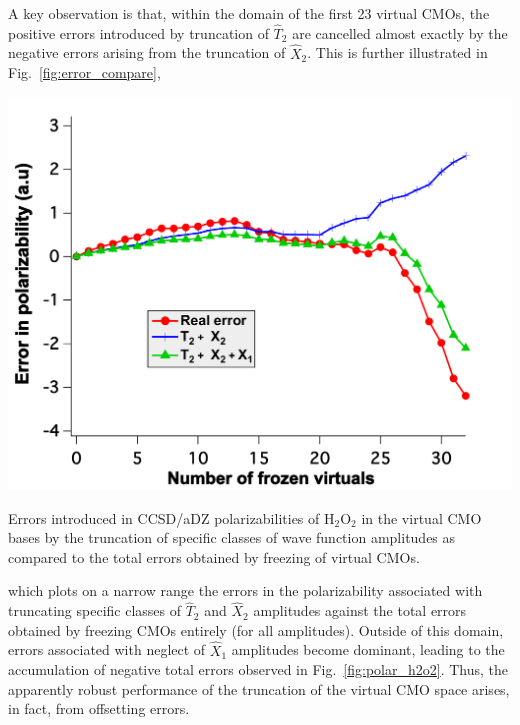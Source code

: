 A key observation is that, within the domain of the first 23 virtual CMOs, the
positive errors introduced by truncation of $\hat{T}_2$ are cancelled almost
exactly by the negative errors arising from the truncation of $\hat{X}_2$.
This is further illustrated in Fig.~\ref{fig:error_compare}, 
\begin{MyFigure}[h!]
\centering
\includegraphics[width=0.6\linewidth,natwidth=610,natheight=642]{figures_fvno/error_cmpare.pdf}
\caption{{\footnotesize Errors introduced in CCSD/aDZ polarizabilities of
H$_2$O$_2$ in the virtual CMO bases by the truncation of specific classes of wave
function amplitudes as compared to the total errors obtained by freezing of
virtual CMOs.}}
\label{fig:error_compare}
\end{MyFigure}
which plots on a narrow range the errors in the polarizability associated with truncating
specific classes of $\hat{T}_2$ and $\hat{X}_2$ amplitudes against the total errors
obtained by freezing CMOs entirely (for all amplitudes).  Outside of this
domain, errors associated with neglect of $\hat{X}_1$ amplitudes become
dominant, leading to the accumulation of negative total errors observed in
Fig.~\ref{fig:polar_h2o2}.  Thus, the apparently robust performance of the
truncation of the virtual CMO space arises, in fact, from offsetting
errors.

